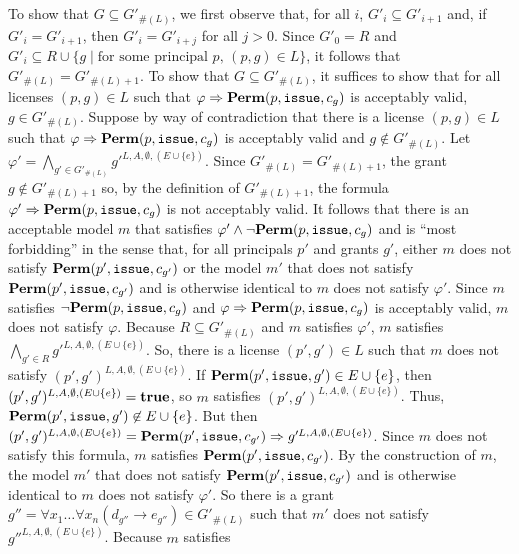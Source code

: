 \documentclass{acmtrans2m}
\newcommand{\rimp}{\Rightarrow}
\newcommand{\<}{
}
\renewcommand{\>}{\rangle}
\newcommand{\union}{\cup}
\renewcommand{\phi}{\varphi}
\newcommand{\card}[1]{\#({#1})}
\newcommand{\true}{\mathit{\bf{true}}}
\newcommand{\Permitted}{\mathit{\bf Perm}}
\newcommand{\cd}{d}
\newcommand{\cc}{e}
\newcommand{\scc}{E}
\newcommand{\issue}{\mathtt{issue}}
\newcommand{\imp}{\rightarrow}
\newcommand{\transwithE}[5]{#1^{#2, #3, #4, #5}}
\begin{document}
\begin{sloppypar}
To show that $G\subseteq G'_{\card{L}}$, we first observe that, for all $i$, $G'_i \subseteq G'_{i+1}$
and, if $G'_i = G'_{i+1}$, then $G'_i = G'_{i+j}$ for all $j > 0$.  Since $G'_0 = R$ and
$G'_i \subseteq R\union\{g\mid\mbox{for some principal $p$, }(p, g)\in L\}$, it follows that
$G'_{\card{L}} = G'_{\card{L} + 1}$.  To show that $G\subseteq G'_{\card{L}}$, it suffices to show that
for all licenses $(p,g)\in L$ such that $\phi\rimp\Permitted(p, \issue, c_g)$ is acceptably valid,
$g\in G'_{\card{L}}$.  Suppose by way of contradiction that there is a license $(p,g)\in L$ such that
$\phi\rimp\Permitted(p, \issue, c_g)$ is acceptably valid and $g\not\in G'_{\card{L}}$.  Let
$\phi' = \bigwedge_{g'\in G'_{\card{L}}}\transwithE{g'}{L}{A}{\emptyset}{(E\union\{\cc\})}$.  Since
$G'_{\card{L}} = G'_{\card{L}+1}$, the grant $g \not\in G'_{\card{L}+1}$ so, by the definition of
$G'_{\card{L}+1}$, the formula $\phi' \rimp\Permitted(p,\issue, c_g)$ is not acceptably valid.  It
follows that there is an acceptable model $m$ that satisfies $\phi'\land\neg\Permitted(p,\issue, c_g)$
and is ``most forbidding'' in the sense that, for all principals $p'$ and grants $g'$, either $m$ does
not satisfy $\Permitted(p', \issue, c_{g'})$ or the model $m'$ that does not satisfy
$\Permitted(p', \issue, c_{g'})$ and is otherwise identical to $m$ does not satisfy $\phi'$.  Since $m$ satisfies $\neg\Permitted(p,\issue, c_g)$ and $\phi\rimp\Permitted(p, \issue, c_g)$ is acceptably valid,
$m$ does not satisfy $\phi$.  Because $R\subseteq G'_{\card{L}}$ and $m$ satisfies $\phi'$, $m$
satisfies $\bigwedge_{g'\in R}\transwithE{g'}{L}{A}{\emptyset}{(E\union\{\cc\})}$.  So, there is a
license $(p',g')\in L$ such that $m$ does not satisfy
$\transwithE{(p',g')}{L}{A}{\emptyset}{(E\union\{\cc\})}$.  If
$\Permitted(p', \issue, g')\in \scc\union\{\cc\}$, then
$\transwithE{(p', g')}{L}{A}{\emptyset}{(\scc\union\{\cc\})} = \true$,
so $m$ satisfies $\transwithE{(p',g')}{L}{A}{\emptyset}{(E\union\{\cc\})}$.  Thus,
$\Permitted(p', \issue, g')\not\in \scc\union\{\cc\}$.  But then
$\transwithE{(p', g')}{L}{A}{\emptyset}{(\scc\union\{\cc\})} =
\Permitted(p', \issue, c_{g'})\rimp\transwithE{g'}{L}{A}{\emptyset}{(\scc\union\{\cc\})}$.
Since $m$ does not satisfy this formula, $m$ satisfies $\Permitted(p', \issue, c_{g'})$.  By the
construction of $m$, the model $m'$ that does not satisfy $\Permitted(p', \issue, c_{g'})$ and is
otherwise identical to $m$ does not satisfy $\phi'$.  So there is a grant
$g'' = \forall x_1\ldots \forall x_n(\cd_{g''} \imp \cc_{g''})\in G'_{\card{L}}$ such that $m'$
does not satisfy $\transwithE{g''}{L}{A}{\emptyset}{(\scc\union\{\cc\})}$.  Because $m$ satisfies

\end{sloppypar}
\end{document}
